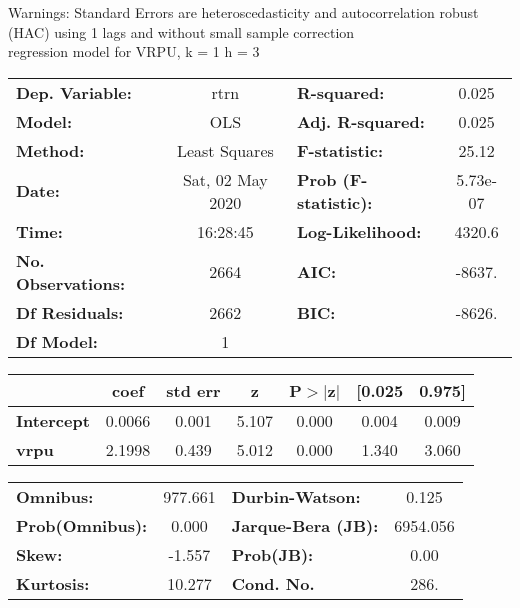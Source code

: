 Warnings: \newline
 [1] Standard Errors are heteroscedasticity and autocorrelation robust (HAC) using 1 lags and without small sample correction\\ 

regression model for VRPU, k = 1 h = 3\begin{center}
\begin{tabular}{lclc}
\toprule
\textbf{Dep. Variable:}    &       rtrn       & \textbf{  R-squared:         } &     0.025   \\
\textbf{Model:}            &       OLS        & \textbf{  Adj. R-squared:    } &     0.025   \\
\textbf{Method:}           &  Least Squares   & \textbf{  F-statistic:       } &     25.12   \\
\textbf{Date:}             & Sat, 02 May 2020 & \textbf{  Prob (F-statistic):} &  5.73e-07   \\
\textbf{Time:}             &     16:28:45     & \textbf{  Log-Likelihood:    } &    4320.6   \\
\textbf{No. Observations:} &        2664      & \textbf{  AIC:               } &    -8637.   \\
\textbf{Df Residuals:}     &        2662      & \textbf{  BIC:               } &    -8626.   \\
\textbf{Df Model:}         &           1      & \textbf{                     } &             \\
\bottomrule
\end{tabular}
\begin{tabular}{lcccccc}
                   & \textbf{coef} & \textbf{std err} & \textbf{z} & \textbf{P$> |$z$|$} & \textbf{[0.025} & \textbf{0.975]}  \\
\midrule
\textbf{Intercept} &       0.0066  &        0.001     &     5.107  &         0.000        &        0.004    &        0.009     \\
\textbf{vrpu}      &       2.1998  &        0.439     &     5.012  &         0.000        &        1.340    &        3.060     \\
\bottomrule
\end{tabular}
\begin{tabular}{lclc}
\textbf{Omnibus:}       & 977.661 & \textbf{  Durbin-Watson:     } &    0.125  \\
\textbf{Prob(Omnibus):} &   0.000 & \textbf{  Jarque-Bera (JB):  } & 6954.056  \\
\textbf{Skew:}          &  -1.557 & \textbf{  Prob(JB):          } &     0.00  \\
\textbf{Kurtosis:}      &  10.277 & \textbf{  Cond. No.          } &     286.  \\
\bottomrule
\end{tabular}
\end{center}


